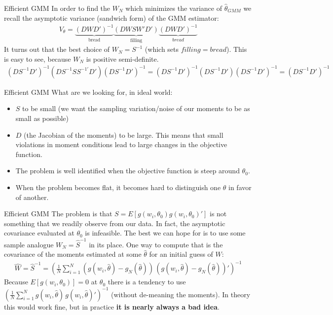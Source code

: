 \documentclass[aspectratio=169]{beamer}
\begin{document}
\begin{frame}{Efficient GMM}
In order to find the $W_N$ which minimizes the variance of $\hat{\theta}_{GMM}$ we recall the asymptotic variance (\alert{sandwich form}) of the GMM estimator:
\begin{eqnarray*}
V_{\theta} =\underbrace{(D W D')^{-1}}_{\text{bread}} \underbrace{(D W S W' D')}_{\text{filling}} \underbrace{(D W D')^{-1}}_{bread}
\end{eqnarray*}
It turns out that the best choice of $W_N = S^{-1}$ (which sets $filling = bread$). This is easy to see, because $W_N$ is positive semi-definite.
\begin{eqnarray*}
(D S^{-1} D')^{-1} (D S^{-1} S S^{-1'} D') (D S^{-1} D')^{-1} = (D S^{-1} D')^{-1} (D S^{-1} D') (D S^{-1} D')^{-1} = (D S^{-1} D')^{-1}
\end{eqnarray*}
\end{frame}

\begin{frame}{Efficient GMM}
What are we looking for, in ideal world:
\begin{itemize}
\item  $S$ to be small (we want the sampling variation/noise of our moments to be as small as possible)
\item $D$ (the Jacobian of the moments) to be large. This means that small violations in moment conditions lead to large changes in the objective function.
\item  The problem is well identified when the objective function is steep around $\theta_0$. 
\item When the problem becomes flat, it becomes hard to distinguish one $\theta$ in favor of another.
\end{itemize}
\end{frame}

\begin{frame}{Efficient GMM}
The problem is that $S = E[g(w_i,\theta_0) g(w_i,\theta_0)']$ is not something that we readily observe from our data. In fact, the asymptotic covariance evaluated at $\theta_0$ is \alert{infeasible}. The best we can hope for is to use some sample analogue $W_N=\hat{S}^{-1}$ in its place. One way to compute that is the covariance of the moments estimated at some $\hat{\theta}$ for an initial guess of $W$:
\begin{eqnarray*}
\hat{W} = \hat{S}^{-1} = \left(\frac{1}{N} \sum_{i=1}^N (g(w_i,\hat{\theta}) - g_N(\hat{\theta}))  \, (g(w_i,\hat{\theta}) - g_N(\hat{\theta}))'\right)^{-1}
\end{eqnarray*}
Because $E[g(w_i,\theta_0)]=0$ at $\theta_0$ there is a tendency to use $\left(\frac{1}{N} \sum_{i=1}^N g(w_i,\hat{\theta}) \, g(w_i,\hat{\theta} )'\right)^{-1}$ (without de-meaning the moments). In theory this would work fine, but in practice \textbf{it is nearly always a bad idea}.\\
\end{frame}
\end{document}
